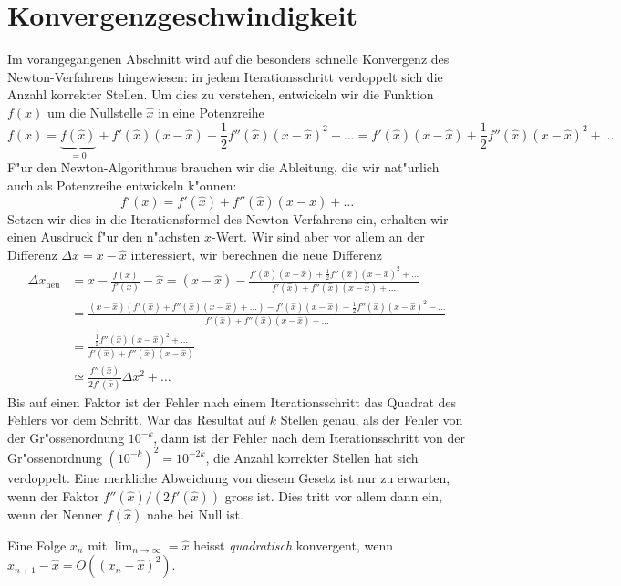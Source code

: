\section{Konvergenzgeschwindigkeit\label{section:newton:konvergenz}}
Im vorangegangenen Abschnitt wird auf die besonders schnelle Konvergenz
des Newton-Verfahrens hingewiesen: in jedem Iterationsschritt verdoppelt
sich die Anzahl korrekter Stellen.
Um dies zu verstehen, entwickeln wir die Funktion $f(x)$ um die
Nullstelle $\hat{x}$ in eine Potenzreihe
\[
f(x)
=
\underbrace{f(\hat{x})}_{=0} + f'(\hat{x})(x-\hat{x})
+ \frac12 f''(\hat{x}) (x-\hat{x})^2+\dots
=
f'(\hat{x})(x-\hat{x}) + \frac12 f''(\hat{x}) (x-\hat{x})^2+\dots
\]
F"ur den Newton-Algorithmus brauchen wir die Ableitung, die wir
nat"urlich auch als Potenzreihe entwickeln k"onnen:
\[
f'(x)=f'(\hat{x})+f''(\hat{x})(x-\hat{x})+\dots
\]
Setzen wir dies in die Iterationsformel des Newton-Verfahrens ein, erhalten
wir einen Ausdruck f"ur den n"achsten $x$-Wert.
Wir sind aber vor allem an der Differenz $\Delta x=x-\hat{x}$ interessiert, wir
berechnen die neue Differenz
\begin{align*}
\Delta x_{\text{neu}}
&=
x-\frac{f(x)}{f'(x)}-\hat{x}
=
(x-\hat{x})-\frac{f'(\hat{x})(x-\hat{x}) + \frac12 f''(\hat{x}) (x-\hat{x})^2+\dots}{ f'(\hat{x})+f''(\hat{x})(x-\hat{x})+\dots}
\\
&=
\frac{
(x-\hat{x})(f'(\hat{x})+f''(\hat{x})(x-\hat{x})+\dots)
-
f'(\hat{x})(x-\hat{x}) - \frac12 f''(\hat{x}) (x-\hat{x})^2-\dots
}{f'(\hat{x})+f''(\hat{x})(x-\hat{x})+\dots}
\\
&=
\frac{\frac12f''(\hat{x})(x-\hat{x})^2+\dots}{f'(\hat{x})+f''(\hat{x})(x-\hat{x})}
\\
&\simeq \frac{f''(\hat{x})}{2f'(\hat{x})} \Delta x^2+\dots
\end{align*}
Bis auf einen Faktor ist der Fehler nach einem Iterationsschritt
das Quadrat des Fehlers vor dem Schritt.
War das Resultat auf $k$ Stellen genau, als der Fehler von der Gr"ossenordnung
$10^{-k}$, dann ist der Fehler nach dem Iterationsschritt von der
Gr"ossenordnung $(10^{-k})^2=10^{-2k}$, die Anzahl korrekter Stellen
hat sich verdoppelt.
Eine merkliche Abweichung von diesem Gesetz ist nur zu erwarten, wenn
der Faktor $f''(\hat{x})/(2f'(\hat{x}))$ gross ist.
Dies tritt vor allem dann ein, wenn der Nenner $f(\hat{x})$
nahe bei Null ist.

\begin{definition}
Eine Folge $x_n$ mit $\lim_{n\to\infty}=\hat{x}$ heisst {\em quadratisch}
konvergent, wenn $x_{n+1}-\hat{x} = O((x_n-\hat{x})^2)$.
\end{definition}

